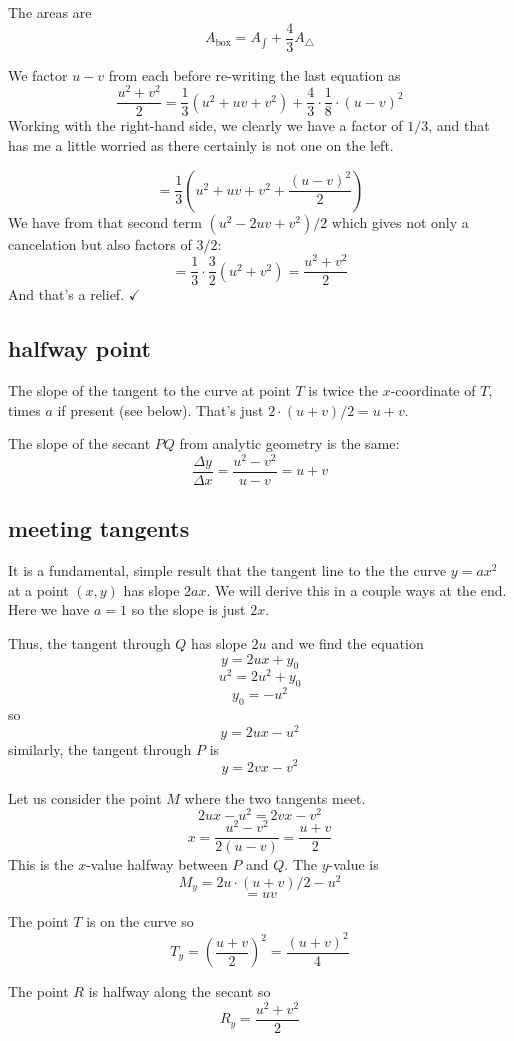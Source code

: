\documentclass[11pt, oneside]{article}
\begin{document}
The areas are
\[ A_{\text{box}} = A_{\int} + \frac{4}{3} A_{\triangle} \]

We factor $u-v$ from each before re-writing the last equation as
\[ \frac{u^2 + v^2}{2}  = \frac{1}{3} (u^2 + uv + v^2) + \frac{4}{3} \cdot  \frac{1}{8} \cdot (u-v)^2 \]
Working with the right-hand side, we clearly we have a factor of $1/3$, and that has me a little worried as there certainly is not one on the left.

\[ = \frac{1}{3} (u^2 + uv + v^2 + \frac{(u-v)^2}{2}) \]
We have from that second term $(u^2 - 2uv + v^2)/2$ which gives not only a cancelation but also factors of $3/2$:
\[ = \frac{1}{3} \cdot \frac{3}{2}(u^2 + v^2) = \frac{u^2 + v^2}{2} \]
And that's a relief.  $\checkmark$

\subsection*{halfway point}
The slope of the tangent to the curve at point $T$ is twice the $x$-coordinate of $T$, times $a$ if present (see below).  That's just $2 \cdot (u + v)/2 = u + v$.

The slope of the secant $PQ$ from analytic geometry is the same:
\[ \frac{\Delta y}{\Delta x} = \frac{u^2 - v^2}{u - v} = u + v \]

\subsection*{meeting tangents}

It is a fundamental, simple result that the tangent line to the the curve $y = ax^2$ at a point $(x,y)$ has slope $2ax$.  We will derive this in a couple ways at the end.  Here we have $a = 1$ so the slope is just $2x$.

Thus, the tangent through $Q$ has slope $2u$ and we find the equation
\[ y = 2ux + y_0 \]
\[ u^2 = 2u^2 + y_0 \]
\[ y_0 = -u^2 \]
so
\[ y = 2ux - u^2 \]
similarly, the tangent through $P$ is
\[ y = 2vx - v^2 \]

Let us consider the point $M$ where the two tangents meet.  
\[ 2ux - u^2 = 2vx - v^2 \]
\[ x = \frac{u^2 - v^2}{2(u - v)} = \frac{u+v}{2} \]
This is the $x$-value halfway between $P$ and $Q$.  The $y$-value is
\[ M_y = 2u \cdot (u+v)/2 - u^2 \]
\[ = uv \]

The point $T$ is on the curve so
\[ T_y = (\frac{u+v}{2})^2 = \frac{(u+v)^2}{4} \]

The point $R$ is halfway along the secant so
\[ R_y = \frac{u^2 + v^2}{2} \]
\end{document}
